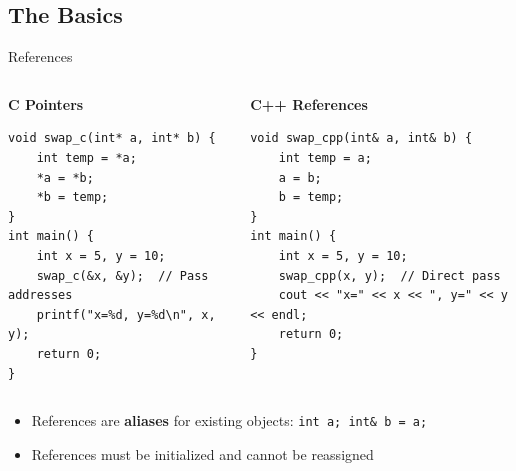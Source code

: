 \subsection{The Basics}
\begin{frame}[fragile]{References}
	\begin{columns}
		\begin{column}{0.5\textwidth}
			\textbf{C Pointers}
			\begin{verbatim}
void swap_c(int* a, int* b) {
    int temp = *a;
    *a = *b;
    *b = temp;
}
int main() {
    int x = 5, y = 10;
    swap_c(&x, &y);  // Pass addresses
    printf("x=%d, y=%d\n", x, y);
    return 0;
}
			\end{verbatim}
		\end{column}
		\begin{column}{0.5\textwidth}
			\textbf{C++ References}
			\begin{verbatim}
void swap_cpp(int& a, int& b) {
    int temp = a;
    a = b;
    b = temp;
}
int main() {
    int x = 5, y = 10;
    swap_cpp(x, y);  // Direct pass
    cout << "x=" << x << ", y=" << y << endl;
    return 0;
}
			\end{verbatim}
		\end{column}
	\end{columns}

	\vspace{0.5em}
	\begin{itemize}
		\item References are \textbf{aliases} for existing objects: \texttt{int a; int\& b = a;}
		\item References must be initialized and cannot be reassigned
	\end{itemize}
\end{frame}


